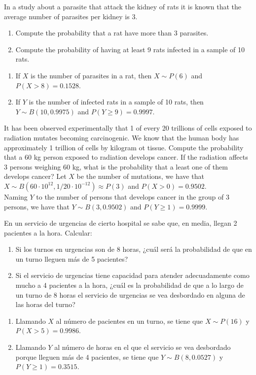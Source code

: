 {In a study about a parasite that attack the kidney of rats it is known that the average number of parasites per
kidney is 3. 
\begin{enumerate}
\item Compute the probability that a rat have more than 3 parasites.
\item Compute the probability of having at least 9 rats infected in a sample of 10 rats. 
\end{enumerate}
}
{
\begin{enumerate}
\item If $X$ is the number of parasites in a rat, then $X\sim P(6)$ and $P(X>8)=0.1528$.
\item If $Y$ is the number of infected rats in a sample of 10 rats, then $Y\sim B(10,0.9975)$ and $P(Y\geq
9)=0.9997$.
\end{enumerate}
}
{}


{It has been observed experimentally that 1 of every 20 trillions of cells exposed to radiation mutates becoming
carcinogenic. 
We know that the human body has approximately 1 trillion of cells by kilogram ot tissue. 
Compute the probability that a 60 kg person exposed to radiation develops cancer.
If the radiation affects 3 persons weighing 60 kg, what is the probability that a least one of them develops cancer? }
{Let $X$ be the number of mutations, we have that $X\sim B(60\cdot 10^{12},1/20\cdot 10^{-12})\approx P(3)$ and $P(X>0)=0.9502$.\\ 
Naming $Y$ to the number of persons that develops cancer in the group of 3 persons, we have that $Y\sim B(3,0.9502)$ and $P(Y\geq 1)=0.9999$.
}
{}


{En un servicio de urgencias de cierto hospital se sabe que, en media, llegan 2 pacientes a la hora.
Calcular:
\begin{enumerate}
\item Si los turnos en urgencias son de 8 horas, ¿cuál será la probabilidad de que en un turno lleguen más de 5 pacientes?
\item Si el servicio de urgencias tiene capacidad para atender adecuadamente como mucho a 4 pacientes a la hora, ¿cuál
es la probabilidad de que a lo largo de un turno de 8 horas el servicio de urgencias se vea desbordado en alguna de las
horas del turno?
\end{enumerate}
}
{
\begin{enumerate}
\item Llamando $X$ al número de pacientes en un turno, se tiene que $X\sim P(16)$ y $P(X>5)=0.9986$.
\item Llamando $Y$ al número de horas en el que el servicio se vea desbordado porque lleguen más de 4 pacientes, se
tiene que $Y\sim B(8,0.0527)$ y $P(Y\geq 1)=0.3515$.
\end{enumerate}
}
{}


